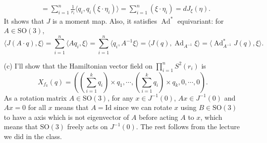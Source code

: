 \documentclass[a4paper, 12pt]{article}
\theoremstyle{Mydefinition}
\theoremstyle{Mytheorem}
\DeclareMathOperator{\Ad}{Ad}
\begin{document}
\begin{enumerate}
\begin{equation*}
\begin{split}
        &=\sum_{i=1}^n \frac{1}{r_i}\langle q_i, q_i(\xi\cdot \eta_i)\rangle=\sum_{i=1}^n (\xi\cdot \eta_i) = dJ_\xi(\eta).
    \end{split}
    \end{equation*}
    It shows that $J$ is a moment map. Also, it satisfies $\Ad^*$ equivariant: for $A\in \mathrm{SO}(3)$,
    \begin{equation*}
        \langle J(A\cdot q), \xi\rangle = \sum_{i=1}^n \langle Aq_i, \xi\rangle = \sum_{i=1}^n \langle q_i, A^{-1}\xi\rangle = \langle J(q), \Ad_{A^{-1}}\xi\rangle = \langle \Ad^*_{A^{-1}}J(q), \xi\rangle.
    \end{equation*}
    \item[(c)] I'll show that the Hamiltonian vector field on $\prod_{i=1}^n S^2(r_i)$ is
    \begin{equation*}
        X_{f_k}(q) = \left(\left(\sum_{i=1}^{k}q_i\right)\times q_1, \cdots, \left(\sum_{i=1}^{k}q_i\right)\times q_{k}, 0, \cdots, 0\right).
    \end{equation*}
    As a rotation matrix $A\in \mathrm{SO}(3)$, for any $x\in J^{-1}(0)$, $Ax\in J^{-1}(0)$ and $Ax = 0$ for all $x$ means that $A=\mathrm{Id}$ since we can rotate $x$ using $B\in \mathrm{SO}(3)$ to have a axis which is not eigenvector of $A$ before acting $A$ to $x$, which means that $\mathrm{SO}(3)$ freely acts on $J^{-1}(0)$. The rest follows from the lecture we did in the class.
    

\end{enumerate}
\end{document}
